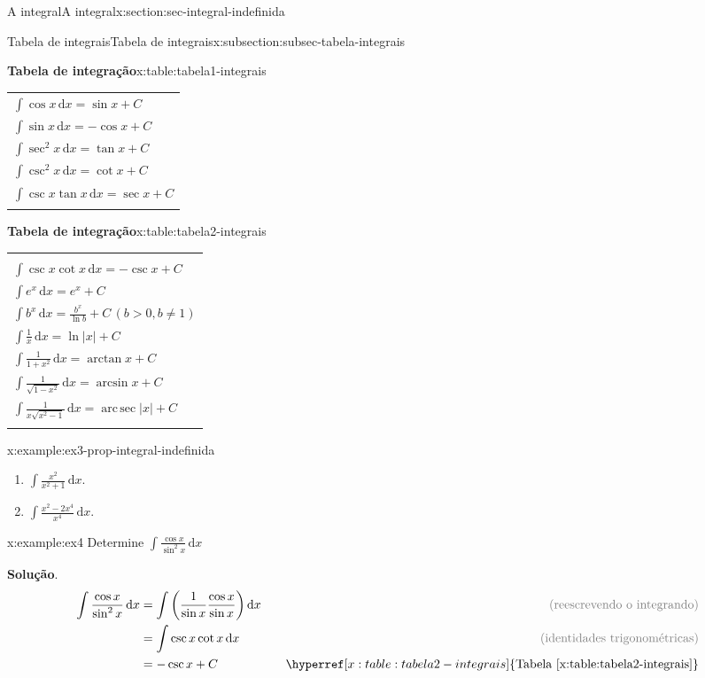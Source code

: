 \documentclass[oneside,10pt,]{article}
\newcommand{\blocktitlefont}{\relax}
\newcommand{\tabularfont}{\relax}
\newcommand{\xreffont}{\relax}
\numberwithin{equation}{section}
\newcommand{\hrulethin}  {\noalign{\hrule height 0.04em}}
\newcommand{\hrulemedium}{\noalign{\hrule height 0.07em}}
\newcommand{\hrulethick} {\noalign{\hrule height 0.11em}}
\newcommand{\dd}{\mathrm{d}}
\newcommand{\integral}[2]{\displaystyle\int {#1}\,\dd {#2}}
\DeclareMathOperator{\arcsec}{arc \,sec}
\newcommand{\amp}{&}
\begin{document}
\begin{sectionptx}{A integral}{}{A integral}{}{}{x:section:sec-integral-indefinida}
\begin{subsectionptx}{Tabela de integrais}{}{Tabela de integrais}{}{}{x:subsection:subsec-tabela-integrais}
\begin{tableptx}{\textbf{Tabela de integração}}{x:table:tabela1-integrais}{}
{\begin{tabular}{l}
\(\integral{\cos{x}}{x}=\sin{x} + C\)\tabularnewline[0pt]
\(\integral{\sin{x}}{x}=-\cos{x} + C\)\tabularnewline[0pt]
\(\integral{\sec^2{x}}{x}=\tan{x} + C\)\tabularnewline[0pt]
\(\integral{\csc^2{x}}{x}=\cot{x} + C\)\tabularnewline[0pt]
\(\integral{\csc{x}\tan{x}}{x}=\sec{x} + C\)\tabularnewline\hrulemedium
\end{tabular}
}%
\end{tableptx}%
\begin{tableptx}{\textbf{Tabela de integração}}{x:table:tabela2-integrais}{}%
\centering
{\tabularfont%
\begin{tabular}{l}\hrulethick
\multicolumn{1}{c}{Fórmula}\tabularnewline\hrulethin
\(\integral{\csc{x}\cot{x}}{x}=-\csc{x} + C\)\tabularnewline[0pt]
\(\integral{e^x}{x} = e^x + C\)\tabularnewline[0pt]
\(\integral{b^x}{x}= \frac{b^x}{\ln{b}} + C\, (b>0, b\neq 1)\)\tabularnewline[0pt]
\(\integral{\frac{1}{x}}{x}=\ln{|x|} + C\)\tabularnewline[0pt]
\(\integral{\frac{1}{1+x^2}}{x}=\arctan{x} + C\)\tabularnewline[0pt]
\(\integral{\frac{1}{\sqrt{1-x^2}}}{x}=\arcsin{x} + C\)\tabularnewline[0pt]
\(\integral{\frac{1}{x\sqrt{x^2-1}}}{x}=\arcsec{|x|} + C\)\tabularnewline\hrulemedium
\end{tabular}
}%
\end{tableptx}%
\begin{example}{}{x:example:ex3-prop-integral-indefinida}%
\begin{enumerate}[font=\bfseries,label=(\alph*),ref=\alph*]
\item{}\(\integral{\frac{x^2}{x^2+1}}{x}\).%
 \item{}\(\integral{\frac{x^2- 2x^4}{x^4}}{x}\).%
\end{enumerate}
%
\end{example}
\begin{example}{}{x:example:ex4}%
Determine \(\integral{\frac{\cos{x}}{\sin^2{x}}}{x}\)%
\par\smallskip%
\noindent\textbf{\blocktitlefont Solução}.\hypertarget{g:solution:idp30}{}\quad{}%
\begin{align*}
\integral{\frac{\cos{x}}{\sin^2{x}}}{x}\amp = \integral{\left(\frac{1}{\sin{x}}\frac{\cos{x}}{\sin{x}}\right)}{x} \quad \amp\color{gray}{\text{(reescrevendo o integrando)}}\\
\amp = \integral{\csc{x}\cot{x}}{x} \amp \color{gray}{\text{(identidades trigonométricas)}}\\
\amp = -\csc{x} + C \quad \amp \hyperref[x:table:tabela2-integrais]{\text{Tabela {\xreffont\ref{x:table:tabela2-integrais}}}}
\end{align*}

\end{example}
\end{subsectionptx}
\end{sectionptx}
\end{document}
